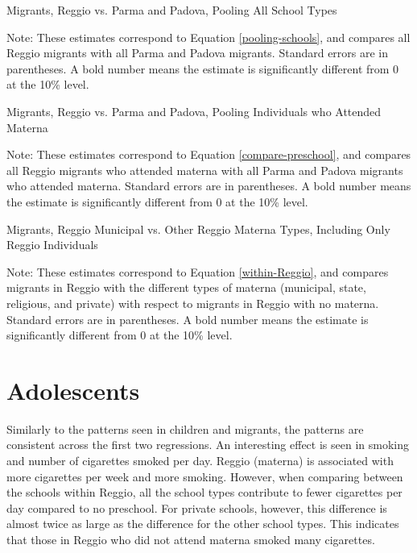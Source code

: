 \documentclass{article}
\begin{document}
\begin{table}[H]
\begin{center}
	\caption{Migrants, Reggio vs. Parma and Padova, Pooling All School Types}
		
\end{center}
\raggedright
\footnotesize
Note: These estimates correspond to Equation \ref{pooling-schools}, and compares all Reggio migrants with all Parma and Padova migrants. Standard errors are in parentheses. A bold number means the estimate is significantly different from 0 at the 10\% level. 
\end{table}

\begin{table}[H]
\begin{center}
	\caption{Migrants, Reggio vs. Parma and Padova, Pooling Individuals who Attended Materna}
		
\end{center}
\raggedright
\footnotesize
Note: These estimates correspond to Equation \ref{compare-preschool}, and compares all Reggio migrants who attended materna with all Parma and Padova migrants who attended materna. Standard errors are in parentheses. A bold number means the estimate is significantly different from 0 at the 10\% level. 
\end{table}

\begin{table}[H]
\begin{center}
	\caption{Migrants, Reggio Municipal vs. Other Reggio Materna Types, Including Only Reggio Individuals}
		
\end{center}
\raggedright
\footnotesize
Note: These estimates correspond to Equation \ref{within-Reggio}, and compares migrants in Reggio with the different types of materna (municipal, state, religious, and private) with respect to migrants in Reggio with no materna. Standard errors are in parentheses. A bold number means the estimate is significantly different from 0 at the 10\% level. 
\end{table}



\section{Adolescents}
Similarly to the patterns seen in children and migrants, the patterns are consistent across the first two regressions. An interesting effect is seen in smoking and number of cigarettes smoked per day. Reggio (materna) is associated with more cigarettes per week and more smoking. However, when comparing between the schools within Reggio, all the school types contribute to fewer cigarettes per day compared to no preschool. For private schools, however, this difference is almost twice as large as the difference for the other school types. This indicates that those in Reggio who did not attend materna smoked many cigarettes.
\end{document}

